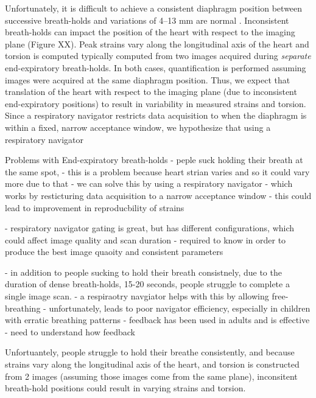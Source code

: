 	Unfortunately, it is difficult to achieve a consistent diaphragm position between successive breath-holds and variations of 4--13 mm are normal \cite{Liu1993,Wang1995a,Taylor1997a,Holland1998c,Fischer2006a}. Inconsistent breath-holds can impact the position of the heart with respect to the imaging plane (Figure XX). Peak strains vary along the longitudinal axis of the heart \cite{Kuijer2002,Moore2000,Young1994a,Feng2009,NasiraeiMoghaddam2010,Donekal2013a,Suever2017} and torsion is computed typically computed from two images acquired during \textit{separate} end-expiratory breath-holds. In both cases, quantification is performed assuming images were acquired at the same diaphragm position. Thus, we expect that translation of the heart with respect to the imaging plane (due to inconsistent end-expiratory positions) to result in variability in measured strains and torsion. Since a respiratory navigator restricts data acquisition to when the diaphragm is within a fixed, narrow acceptance window, we hypothesize that using a respiratory navigator
	
	Problems with End-expiratory breath-holds
	- peple suck holding their breath at the same spot,
	- this is a problem because heart strian varies and so it could vary more due to that
	- we can solve this by using a respiratory navigator
		- which works by resticturing data acquisition to a narrow acceptance window
	- this could lead to improvement in reproducbility of strains
	
	- respiratory navigator gating is great, but has different configurations, which could affect image quality and scan duration
	- required to know in order to produce the best image quaoity and consistent parameters
	
	
	- in addition to people sucking to hold their breath consistnely, due to the duration of dense breath-holds, 15-20 seconds, people struggle to complete a single image scan.
	- a respiraotry navgiator helps with this by allowing free-breathing 
	- unfortunately, leads to poor navigator efficiency, especially in children with erratic breathing patterns
	- feedback has been used in adults and is effective
	- need to understand how feedback
	
	Unfortuantely, people struggle to hold their breathe consistently, and because strains vary along the longitudinal axis of the heart, and torsion is constructed from 2 images (assuming those images come from the same plane), inconsitent breath-hold positions could result in varying strains and torsion.
	
